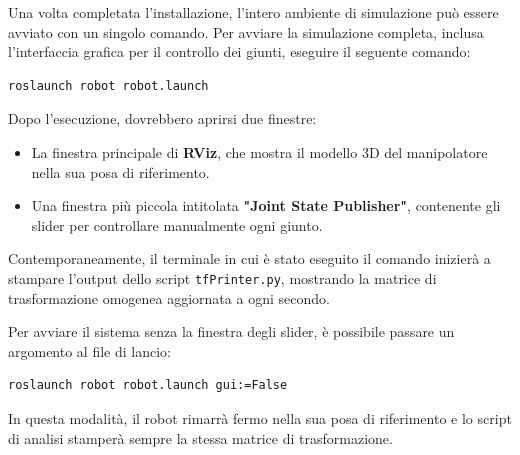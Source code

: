 \documentclass[11pt, a4paper]{report}
\begin{document}
Una volta completata l'installazione, l'intero ambiente di simulazione può essere avviato con un singolo comando. Per avviare la simulazione completa, inclusa l'interfaccia grafica per il controllo dei giunti, eseguire il seguente comando:
\begin{lstlisting}[style=bashStyle]
roslaunch robot robot.launch
\end{lstlisting}
Dopo l'esecuzione, dovrebbero aprirsi due finestre:
\begin{itemize}
    \item La finestra principale di \textbf{RViz}, che mostra il modello 3D del manipolatore nella sua posa di riferimento.
    \item Una finestra più piccola intitolata \textbf{"Joint State Publisher"}, contenente gli slider per controllare manualmente ogni giunto.
\end{itemize}
Contemporaneamente, il terminale in cui è stato eseguito il comando inizierà a stampare l'output dello script \texttt{tfPrinter.py}, mostrando la matrice di trasformazione omogenea aggiornata a ogni secondo.

Per avviare il sistema senza la finestra degli slider, è possibile passare un argomento al file di lancio:
\begin{lstlisting}[style=bashStyle]
roslaunch robot robot.launch gui:=False
\end{lstlisting}
In questa modalità, il robot rimarrà fermo nella sua posa di riferimento e lo script di analisi stamperà sempre la stessa matrice di trasformazione.

\newpage
\end{document}
